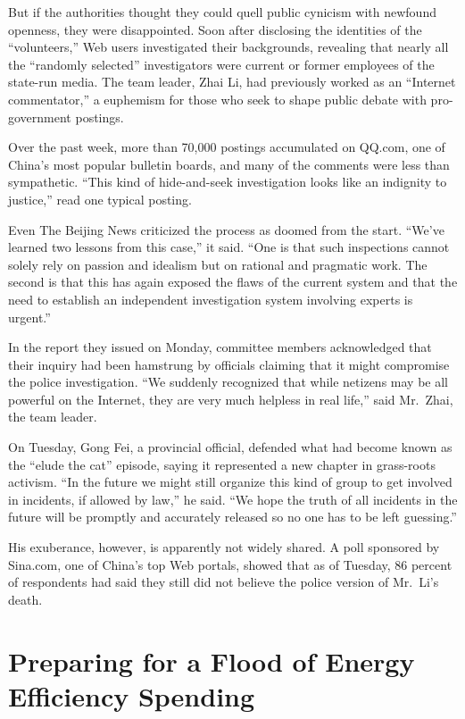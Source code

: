 \documentclass[12pt,a4paper,onecolumn]{article}
\begin{document}
\begin{CJK*}{GBK}{song}
But if the authorities thought they could quell public cynicism with newfound openness, they were
disappointed. Soon after disclosing the identities of the ``volunteers,'' Web users investigated
their backgrounds, revealing that nearly all the ``randomly selected'' investigators were current or
former employees of the state-run media. The team leader, Zhai Li, had previously worked as an
``Internet commentator,'' a euphemism for those who seek to shape public debate with pro-government
postings.

Over the past week, more than 70,000 postings accumulated on QQ.com, one of China's most popular
bulletin boards, and many of the comments were less than sympathetic. ``This kind of hide-and-seek
investigation looks like an indignity to justice,'' read one typical posting.

Even The Beijing News criticized the process as doomed from the start. ``We've learned two lessons
from this case,'' it said. ``One is that such inspections cannot solely rely on passion and idealism
but on rational and pragmatic work. The second is that this has again exposed the flaws of the
current system and that the need to establish an independent investigation system involving experts
is urgent.''

In the report they issued on Monday, committee members acknowledged that their inquiry had been
hamstrung by officials claiming that it might compromise the police investigation. ``We suddenly
recognized that while netizens may be all powerful on the Internet, they are very much helpless in
real life,'' said Mr.~Zhai, the team leader.

On Tuesday, Gong Fei, a provincial official, defended what had become known as the ``elude the cat''
episode, saying it represented a new chapter in grass-roots activism. ``In the future we might still
organize this kind of group to get involved in incidents, if allowed by law,'' he said. ``We hope
the truth of all incidents in the future will be promptly and accurately released so no one has to
be left guessing.''

His exuberance, however, is apparently not widely shared. A poll sponsored by Sina.com, one of
China's top Web portals, showed that as of Tuesday, 86 percent of respondents had said they still
did not believe the police version of Mr.~Li's death.

\section{Preparing for a Flood of Energy Efficiency Spending}


\end{CJK*}
\end{document}
